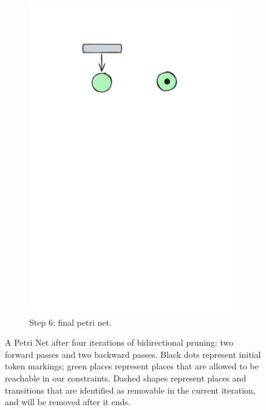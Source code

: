 \begin{figure}[htbp]
\begin{subfigure}[b][\subfigheight][b]{0.23\textwidth}
		\includegraphics[width=\textwidth]{plots/bidirectional_pruning_step_e_updated_2.pdf}
		\caption{Step 6: final petri net.}
		\label{fig:step:e}
	\end{subfigure}
	
	\caption{A Petri Net after four iterations of bidirectional pruning: two forward passes and two backward passes. Black dots represent initial token markings; green places represent places that are allowed to be reachable in our constraints. Dashed shapes represent places and transitions that are identified as removable in the current iteration, and will be removed after it ends.}
	\label{fig:bidirectional_pruning}
\end{figure}




\newpage